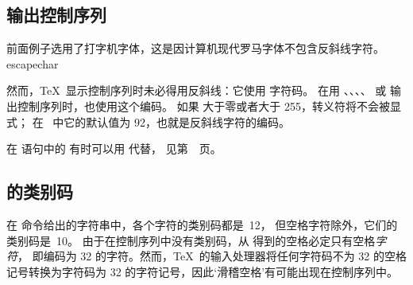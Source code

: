 \documentclass{book}
\begin{document}
\subsection{输出控制序列}

前面例子选用了打字机字体，这是因计算机现代罗马字体不包含反斜线字符。
\cstoidx escapechar\par
然而，\TeX\ 显示控制序列时未必得用反斜线：它使用  字符码。
在用 、、、、
 或  输出控制序列时，也使用这个编码。
如果  大于零或者大于 255，转义符将不会被显式；
在 \IniTeX\ 中它的默认值为 92，也就是反斜线字符的编码。

在  语句中的  有时可以用  代替，
见第~\pageref{expand:write}~页。

\subsection{ 的类别码}

在  命令给出的字符串中，各个字符的类别码都是~12，
但空格字符除外，它们的类别码是~10。
由于在控制序列中没有类别码，从  得到的空格必定只有空格{\em 字符}，
即编码为 32 的字符。然而，\TeX\ 的输入处理器将任何字符码不为 32
的空格记号转换为字符码为 32 的字符记号，因此`滑稽空格'有可能出现在控制序列中。
\end{document}
